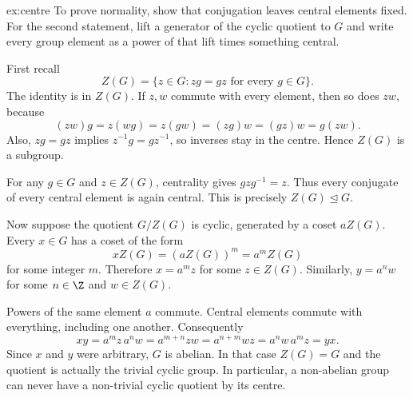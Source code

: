\begin{solution}{ex:centre}
\idea To prove normality, show that conjugation leaves central elements fixed. For the second statement, lift a generator of the cyclic quotient to $G$ and write every group element as a power of that lift times something central.

\writeup First recall
\[
Z(G)=\{z\in G:zg=gz\text{ for every }g\in G\}.
\]
The identity is in $Z(G)$. If $z,w$ commute with every element, then so does $zw$, because
\[
(zw)g=z(wg)=z(gw)=(zg)w=(gz)w=g(zw).
\]
Also, $zg=gz$ implies $z^{-1}g=gz^{-1}$, so inverses stay in the centre. Hence $Z(G)$ is a subgroup.

For any $g\in G$ and $z\in Z(G)$, centrality gives $gzg^{-1}=z$. Thus every conjugate of every central element is again central. This is precisely $Z(G)\trianglelefteq G$.

Now suppose the quotient $G/Z(G)$ is cyclic, generated by a coset $aZ(G)$. Every $x\in G$ has a coset of the form
\[
xZ(G)=(aZ(G))^m=a^mZ(G)
\]
for some integer $m$. Therefore $x=a^mz$ for some $z\in Z(G)$. Similarly, $y=a^nw$ for some $n\in\Z$ and $w\in Z(G)$.

Powers of the same element $a$ commute. Central elements commute with everything, including one another. Consequently
\[
xy=a^mz\,a^nw=a^{m+n}zw
  =a^{n+m}wz=a^nw\,a^mz=yx.
\]
Since $x$ and $y$ were arbitrary, $G$ is abelian. In that case $Z(G)=G$ and the quotient is actually the trivial cyclic group. In particular, a non-abelian group can never have a non-trivial cyclic quotient by its centre.
\end{solution}

